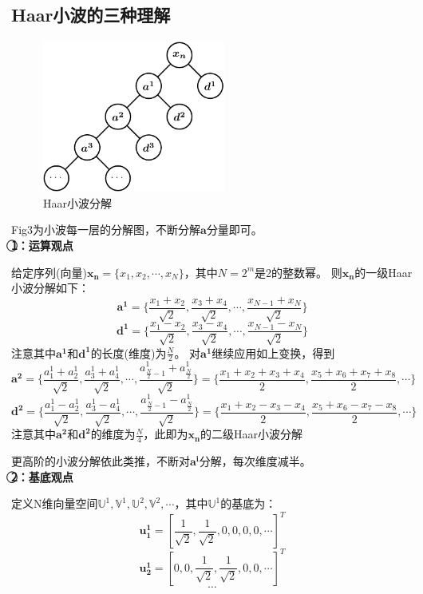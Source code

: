 \documentclass{article}
\begin{document}
\begin{CJK}{UTF8}{gbsn}
\section{Haar小波的三种理解}
\begin{figure}[H]
\centering
\includegraphics[height=5cm,width=6cm]{fig3.pdf}
\caption{Haar小波分解}
\label{3}
\end{figure}
	Fig3为小波每一层的分解图，不断分解$\boldsymbol{a}$分量即可。\\
	\textbf{\textcircled{1}：运算观点}\par
	给定序列(向量)$\boldsymbol{x_n}=\{x_1,x_2,\cdots,x_N\}$，其中$N=2^m$是2的整数幂。
	则$\boldsymbol{x_n}$的一级Haar小波分解如下：
	$$\boldsymbol{a^1}=\{\frac{x_1+x_2}{\sqrt{2}},\frac{x_3+x_4}{\sqrt{2}},\cdots,\frac{x_{N-1}+x_N}{\sqrt{2}}\}$$
	$$\boldsymbol{d^1}=\{\frac{x_1-x_2}{\sqrt{2}},\frac{x_3-x_4}{\sqrt{2}},\cdots,\frac{x_{N-1}-x_N}{\sqrt{2}}\}$$
	注意其中$\boldsymbol{a^1}$和$\boldsymbol{d^1}$的长度(维度)为$\frac{N}{2}$。
	对$\boldsymbol{a^1}$继续应用如上变换，得到
	$$\boldsymbol{a^2}=\{\frac{a^1_1+a^1_2}{\sqrt{2}},\frac{a^1_3+a^1_4}{\sqrt{2}},\cdots,\frac{a^1_{\frac{N}{2}-1}+a^1_{\frac{N}{2}}}{\sqrt{2}}\}=\{\frac{x_1+x_2+x_3+x_4}{2},\frac{x_5+x_6+x_7+x_8}{2},\cdots\}$$
    $$\boldsymbol{d^2}=\{\frac{a^1_1-a^1_2}{\sqrt{2}},\frac{a^1_3-a^1_4}{\sqrt{2}},\cdots,\frac{a^1_{\frac{N}{2}-1}-a^1_{\frac{N}{2}}}{\sqrt{2}}\}=\{\frac{x_1+x_2-x_3-x_4}{2},\frac{x_5+x_6-x_7-x_8}{2},\cdots\}$$
	注意其中$\boldsymbol{a^2}$和$\boldsymbol{d^2}$的维度为$\frac{N}{4}$，此即为$\boldsymbol{x_n}$的二级Haar小波分解\par
	更高阶的小波分解依此类推，不断对$\boldsymbol{a^i}$分解，每次维度减半。\\
	\textbf{\textcircled{2}：基底观点}\par
	定义N维向量空间$\mathbb{U}^1,\mathbb{V}^1,\mathbb{U}^2,\mathbb{V}^2,\cdots$，其中$\mathbb{U}^1$的基底为：
	$$\boldsymbol{u^1_1}=[\frac{1}{\sqrt{2}},\frac{1}{\sqrt{2}},0,0,0,0,\cdots]^T$$
	$$\boldsymbol{u^1_2}=[0,0,\frac{1}{\sqrt{2}},\frac{1}{\sqrt{2}},0,0,\cdots]^T$$
	$$\cdots$$

\end{CJK}
\end{document}
